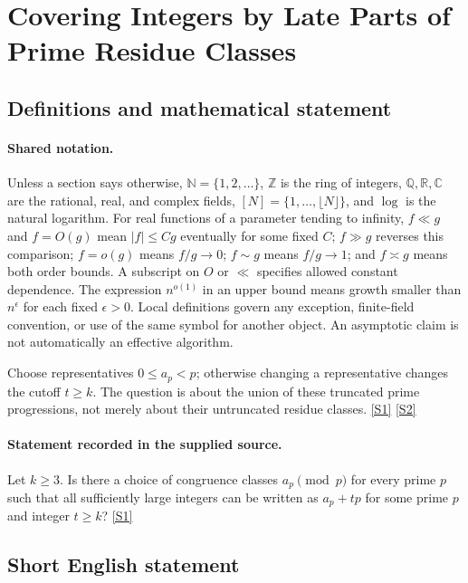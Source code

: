 \documentclass[11pt,a4paper]{article}
\newcommand{\N}{\mathbb{N}}
\newcommand{\Z}{\mathbb{Z}}
\newcommand{\Q}{\mathbb{Q}}
\newcommand{\R}{\mathbb{R}}
\newcommand{\C}{\mathbb{C}}
\newcommand{\sref}[2]{\hyperlink{source:#1:#2}{[S#2]}}
\begin{document}
\section{Covering Integers by Late Parts of Prime Residue Classes}\label{statement}


\subsection{Definitions and mathematical statement}

\paragraph{Shared notation.}Unless a section says otherwise, $\N=\{1,2,\ldots\}$,
$\Z$ is the ring of integers, $\Q,\R,\C$ are the rational, real, and complex
fields, $[N]=\{1,\ldots,\lfloor N\rfloor\}$, and $\log$ is the natural
logarithm. For real functions of a parameter tending to infinity,
$f\ll g$ and $f=O(g)$ mean $|f|\leq Cg$ eventually for some fixed $C$;
$f\gg g$ reverses this comparison; $f=o(g)$ means $f/g\to0$;
$f\sim g$ means $f/g\to1$; and $f\asymp g$ means both order bounds.
A subscript on $O$ or $\ll$ specifies allowed constant dependence.
The expression $n^{o(1)}$ in an upper bound means growth smaller than
$n^\epsilon$ for each fixed $\epsilon>0$. Local definitions govern any
exception, finite-field convention, or use of the same symbol for another
object. An asymptotic claim is not automatically an effective algorithm.



Choose representatives $0\leq a_p<p$; otherwise changing a representative changes the cutoff $t\geq k$. The question is about the union of these truncated prime progressions, not merely about their untruncated residue classes. \sref{statement}{1} \sref{statement}{2}

\paragraph{Statement recorded in the supplied source.}
Let $k\geq 3$. Is there a choice of congruence classes $a_p\pmod{p}$ for every prime $p$ such that all sufficiently large integers can be written as $a_p+tp$ for some prime $p$ and integer $t\geq k$? \sref{statement}{1}

\subsection{Short English statement}
\end{document}
